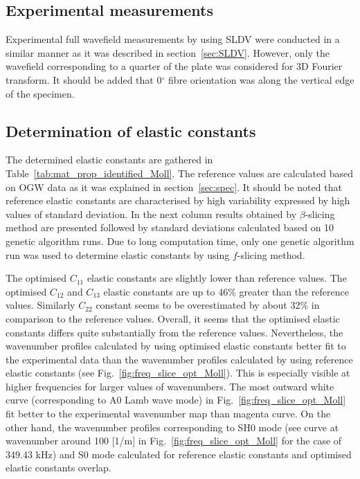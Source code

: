 \documentclass[preprint,12pt]{elsarticle}
\begin{document}
\subsection{Experimental measurements}
Experimental full wavefield measurements by using SLDV were conducted in a similar manner as it was described in section~\ref{sec:SLDV}. 
However, only the wavefield corresponding to a quarter of the plate was considered for 3D Fourier transform.
It should be added that 0\(^{\circ}\) fibre orientation was along the vertical edge of the specimen.
\subsection{Determination of elastic constants}
The determined elastic constants are gathered in Table~\ref{tab:mat_prop_identified_Moll}.
The reference values are calculated based on OGW data as it was explained in section~\ref{sec:spec}.
It should be noted that reference elastic constants are characterised by high variability expressed by high values of standard deviation.
In the next column results obtained by $\beta$-slicing method are presented followed by standard deviations calculated based on 10 genetic algorithm runs.
Due to long computation time, only one genetic algorithm run was used to determine elastic constants by using $f$-slicing method.

The optimised $C_{11}$ elastic constants are slightly lower than reference values.
The optimised $C_{12}$ and $C_{13}$ elastic constants are up to 46\% greater than the reference values.
Similarly $C_{22}$ constant seems to be overestimated by about 32\% in comparison to the reference values.
Overall, it seems that the optimised elastic constants differs quite substantially from the reference values.
Nevertheless, the wavenumber profiles calculated by using optimised elastic constants better fit to the experimental data than the wavenumber profiles calculated by using reference elastic constants (see Fig.~\ref{fig:freq_slice_opt_Moll}).
This is especially visible at higher frequencies for larger values of wavenumbers.
The most outward white curve (corresponding to A0 Lamb wave mode) in Fig.~\ref{fig:freq_slice_opt_Moll} fit better to the experimental wavenumber map than magenta curve.
On the other hand, the wavenumber profiles corresponding to SH0 mode (see curve at wavenumber around 100 [1/m] in Fig.~\ref{fig:freq_slice_opt_Moll} for the case of 349.43 kHz) and S0 mode calculated for reference elastic constants and optimised elastic constants overlap.
\end{document}
